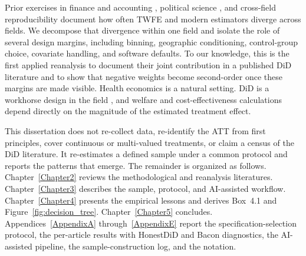 Prior exercises in finance and accounting \parencite{baker2022much}, political science \parencite{chiu2026causal}, and cross-field reproducibility \parencite{brodeur2026reproducibility} document how often TWFE and modern estimators diverge across fields. We decompose that divergence within one field and isolate the role of several design margins, including binning, geographic conditioning, control-group choice, covariate handling, and software defaults. To our knowledge, this is the first applied reanalysis to document their joint contribution in a published DiD literature and to show that negative weights become second-order once these margins are made visible. Health economics is a natural setting. DiD is a workhorse design in the field \parencite{goldsmith2024tracking}, and welfare and cost-effectiveness calculations depend directly on the magnitude of the estimated treatment effect.

This dissertation does not re-collect data, re-identify the ATT from first principles, cover continuous or multi-valued treatments, or claim a census of the DiD literature. It re-estimates a defined sample under a common protocol and reports the patterns that emerge. The remainder is organized as follows. Chapter~\ref{Chapter2} reviews the methodological and reanalysis literatures. Chapter~\ref{Chapter3} describes the sample, protocol, and AI-assisted workflow. Chapter~\ref{Chapter4} presents the empirical lessons and derives Box~4.1 and Figure~\ref{fig:decision_tree}. Chapter~\ref{Chapter5} concludes. Appendices~\ref{AppendixA} through~\ref{AppendixE} report the specification-selection protocol, the per-article results with HonestDiD and Bacon diagnostics, the AI-assisted pipeline, the sample-construction log, and the notation.